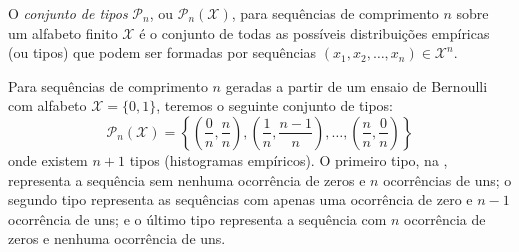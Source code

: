 \begin{definition}
  O \emph{conjunto de tipos} $\mathcal{P}_n$, ou $\mathcal{P}_n (\mathcal{X})$, para sequências de comprimento $n$ sobre um alfabeto finito $\mathcal{X}$ 
    é o conjunto de todas as possíveis distribuições empíricas (ou tipos) que podem ser formadas 
    por sequências $(x_1, x_2, \ldots, x_n) \in \mathcal{X}^n$.
\end{definition}
\begin{example}
Para sequências de comprimento $n$ geradas a partir de um ensaio de Bernoulli com alfabeto $\mathcal{X} = \{0,1\}$,
teremos o seguinte conjunto de tipos:
\begin{equation}\label{eq:exconjtiposbernoulli}
\mathcal{P}_n (\mathcal{X}) = \left\{ \left( \frac{0}{n}, \frac{n}{n} \right), \left( \frac{1}{n} , \frac{n-1}{n} \right), \ldots, \left( \frac{n}{n}, \frac{0}{n} \right)\right\}
\end{equation}
onde existem $n+1$ tipos (histogramas empíricos). O primeiro tipo, na , representa
a sequência sem nenhuma ocorrência de zeros e $n$ ocorrências de uns; o segundo tipo representa 
as sequências com apenas uma ocorrência de zero e $n-1$ ocorrência de uns; e o último tipo
representa a sequência com $n$ ocorrência de zeros e nenhuma ocorrência de uns.
\end{example}


